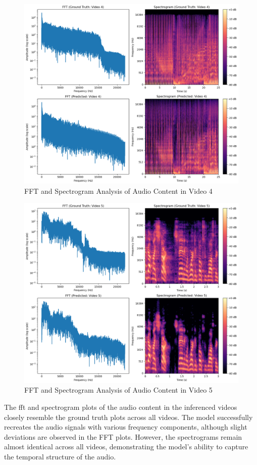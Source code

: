 \begin{figure}[H]
    \centering
    \includegraphics[width=0.8\linewidth]{assets/audio_video_analysis/Video_4_analysis.png}
    \caption{FFT and Spectrogram Analysis of Audio Content in Video 4}
    \label{fig:fft-spec-v4}
\end{figure}

\begin{figure}[H]
    \centering
    \includegraphics[width=0.8\linewidth]{assets/audio_video_analysis/Video_5_analysis.png}
    \caption{FFT and Spectrogram Analysis of Audio Content in Video 5}
    \label{fig:fft-spec-v5}
\end{figure}

The \gls{fft} and spectrogram plots of the audio content in the inferenced videos closely resemble the ground truth plots across all videos. The model successfully recreates the audio signals with various frequency components, although slight deviations are observed in the FFT plots. However, the spectrograms remain almost identical across all videos, demonstrating the model's ability to capture the temporal structure of the audio. 


